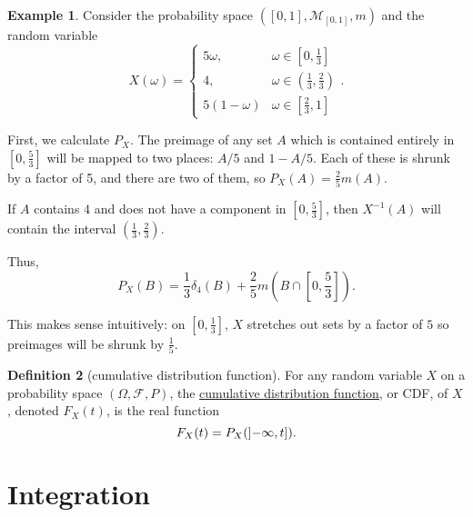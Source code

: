 \documentclass[a4paper,12pt]{scrreprt}
\newcommand{\defn}[1]{\ul{#1}}
\theoremstyle{definition}
\newtheorem{definition}{Definition}
\newtheorem{example}[definition]{Example}
\theoremstyle{plain}
\theoremstyle{remark}
\begin{document}
\begin{example}
  \label{eg:probabilitygeneratedbycomplicatedishfunction}
  Consider the probability space $\left( [0, 1], \mathcal{M}_{[0, 1]}, m \right)$ and the random variable
  \begin{equation*}
    X(\omega) =
    \begin{cases}
      5\omega, & \omega \in \left[ 0, \frac{1}{3} \right] \\
      4, & \omega \in \left( \frac{1}{3}, \frac{2}{3} \right) \\
      5(1-\omega) & \omega \in \left[ \frac{2}{3}, 1 \right]
    \end{cases}.
  \end{equation*}

  First, we calculate $P_{X}$. The preimage of any set $A$ which is contained entirely in $\left[ 0, \frac{5}{3} \right]$ will be mapped to two places: $A/5$ and $1 - A/5$. Each of these is shrunk by a factor of 5, and there are two of them, so $P_{X}(A) = \frac{2}{5}m(A)$.

  If $A$ contains $4$ and does not have a component in $\left[ 0, \frac{5}{3} \right]$, then $X^{-1}(A)$ will contain the interval $\left( \frac{1}{3}, \frac{2}{3} \right)$.

  Thus,
  \begin{equation*}
    P_{X}(B) = \frac{1}{3}\delta_{4}(B) + \frac{2}{5} m\left( B \cap \left[ 0, \frac{5}{3} \right] \right).
  \end{equation*}
\end{example}

This makes sense intuitively: on $[0, \frac{1}{3}]$, $X$ stretches out sets by a factor of $5$ so preimages will be shrunk by $\frac{1}{5}$.

\begin{definition}[cumulative distribution function]
  \label{def:cumulativedistributionfunction}
  For any random variable $X$ on a probability space $(\Omega, \mathcal{F}, P)$, the \defn{cumulative distribution function}, or CDF, of $X$, denoted $F_{X}(t)$, is the real function
  \begin{equation*}
  F_{X}(t) = P_{X}(\interval[open left]{-\infty}{t}).
\end{equation*}
\end{definition}

\chapter{Integration}\label{ch:integration}
\end{document}
